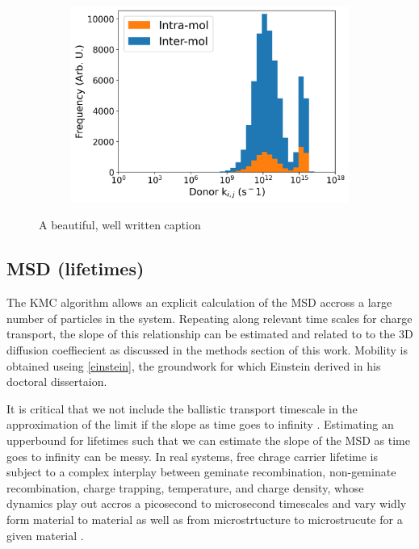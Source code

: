 \begin{figure}[]
\begin{subfigure}{.5\textwidth}
    \includegraphics[width=\textwidth]{figures/donor_hopping_rate_clusters_temp800.png}
\end{subfigure}
\caption[short]{A beautiful, well written caption}
\label{TEMP}
\end{figure}

\subsection{MSD (lifetimes)}

The KMC algorithm allows an explicit calculation of the MSD accross a large number of 
particles in the system. Repeating along relevant time scales for 
charge transport, the slope of this relationship
can be estimated and related to to the 3D diffusion coeffiecient as discussed in the methods section of this
work. Mobility is obtained useing \autoref{einstein}, 
the groundwork for which Einstein derived in his doctoral dissertaion.

It is critical that we not include the ballistic transport timescale in the approximation of the limit
if the slope as time goes to infinity \cite{Maginn2018}. Estimating an upperbound for lifetimes such that
we can estimate the slope of the MSD as time goes to infinity can be messy. In real systems, free chrage
carrier lifetime is subject to a complex interplay between geminate recombination, non-geminate recombination,
charge trapping, temperature, and charge density, whose dynamics play out accros a picosecond to microsecond
timescales and vary widly form material to material as well as from microstrtucture to microstrucute for a
given material \cite{Laquai2015}.

